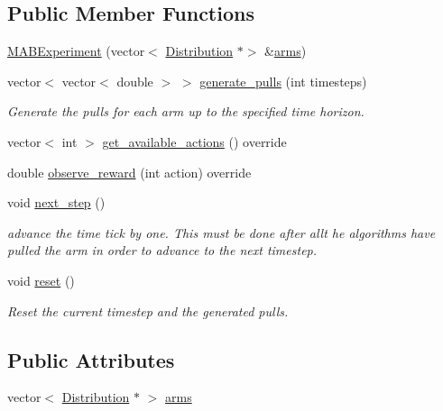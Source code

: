\subsection*{Public Member Functions}
\begin{DoxyCompactItemize}
\item 
\mbox{\hyperlink{class_m_a_b_experiment_a1f24b5ccad7521d47a7f4c3961867063}{M\+A\+B\+Experiment}} (vector$<$ \mbox{\hyperlink{class_distribution}{Distribution}} $\ast$$>$ \&\mbox{\hyperlink{class_m_a_b_experiment_abcea657cec661467e38422059dbd4a2d}{arms}})
\item 
vector$<$ vector$<$ double $>$ $>$ \mbox{\hyperlink{class_m_a_b_experiment_af31d09524129608838d5262678e8de18}{generate\+\_\+pulls}} (int timesteps)
\begin{DoxyCompactList}\small\item\em Generate the pulls for each arm up to the specified time horizon. \end{DoxyCompactList}\item 
vector$<$ int $>$ \mbox{\hyperlink{class_m_a_b_experiment_af64386f9138dcd31873d9218b7adf6fb}{get\+\_\+available\+\_\+actions}} () override
\item 
double \mbox{\hyperlink{class_m_a_b_experiment_acf2ca557df3d30325d8ff180c223a54a}{observe\+\_\+reward}} (int action) override
\item 
void \mbox{\hyperlink{class_m_a_b_experiment_a0159e6c16372d282c0e2afd711da22c8}{next\+\_\+step}} ()
\begin{DoxyCompactList}\small\item\em advance the time tick by one. This must be done after allt he algorithms have pulled the arm in order to advance to the next timestep. \end{DoxyCompactList}\item 
void \mbox{\hyperlink{class_m_a_b_experiment_a8fda8c3d5f6b58751243d59b86cc4f07}{reset}} ()
\begin{DoxyCompactList}\small\item\em Reset the current timestep and the generated pulls. \end{DoxyCompactList}\end{DoxyCompactItemize}
\subsection*{Public Attributes}
\begin{DoxyCompactItemize}
\item 
vector$<$ \mbox{\hyperlink{class_distribution}{Distribution}} $\ast$ $>$ \mbox{\hyperlink{class_m_a_b_experiment_abcea657cec661467e38422059dbd4a2d}{arms}}
\end{DoxyCompactItemize}


